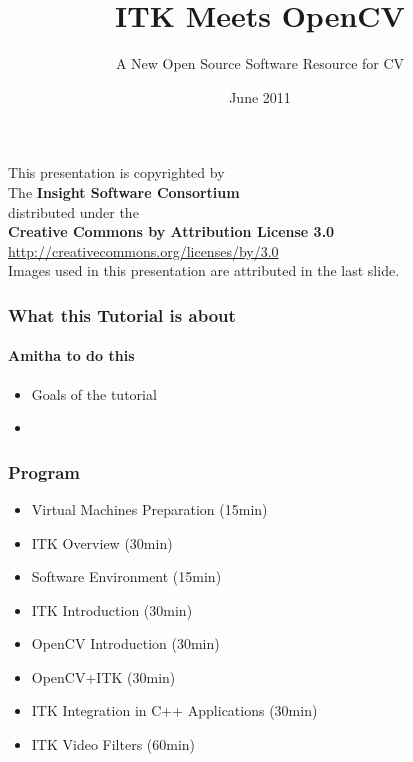 \documentclass[18pt]{beamer}
\begin{document}
\title[ITK - OpenCV]{ITK Meets OpenCV}
\subtitle[ITK-OpenCV]{A New Open Source Software Resource for CV}
\date[June 2011]{June 2011}

\begin{frame}
\titlepage
\end{frame}


{
\begin{frame}[plain]
\center
\begin{center}
This presentation is copyrighted by\\
The \textbf{Insight Software Consortium}\\
\bigskip
distributed under the\\
\textbf{Creative Commons by Attribution License 3.0}\\
\url{http://creativecommons.org/licenses/by/3.0}\\
\bigskip
Images used in this presentation are attributed in the last slide.
\end{center}
\end{frame}
}


\begin{frame}
  \tableofcontents
\end{frame}


\begin{frame}
\frametitle{What this Tutorial is about}
\framesubtitle{Amitha to do this}
\begin{itemize}
\item Goals of the tutorial
\item 
\end{itemize}
\end{frame}


\begin{frame}
\frametitle{Program}
\begin{itemize}
\item Virtual Machines Preparation (15min)
\pause
\item ITK Overview (30min)
\pause
\item Software Environment (15min)
\pause
\item ITK Introduction (30min)
\pause
\item OpenCV Introduction (30min)
\pause
\item OpenCV+ITK (30min)
\pause
\item ITK Integration in C++ Applications (30min)
\pause
\item ITK Video Filters (60min)
\end{itemize}
\end{frame}

















\end{document}
